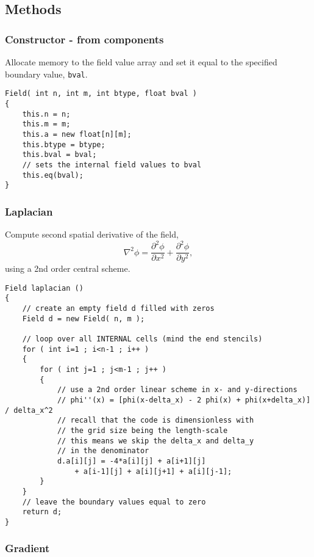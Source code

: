 \documentclass[notitlepage]{article}
\begin{document}
\subsection{Methods}

\subsubsection{Constructor - from components}

Allocate memory to the field value array and set it equal
to the specified boundary value, \texttt{bval}.

\begin{lstlisting}[style=myCpp]
Field( int n, int m, int btype, float bval )
{
	this.n = n;
	this.m = m;
	this.a = new float[n][m];
	this.btype = btype;
	this.bval = bval;
	// sets the internal field values to bval
	this.eq(bval);
}
\end{lstlisting}

\subsubsection{Laplacian}

Compute second spatial derivative of the field,
%
\begin{equation}
\nabla^2 \phi = \frac{\partial^2\phi}{\partial x^2}
	+ \frac{\partial^2\phi}{\partial y^2},
\end{equation}
%
using a 2nd order central scheme.

\begin{lstlisting}[style=myCpp]
Field laplacian ()
{
	// create an empty field d filled with zeros
	Field d = new Field( n, m );
	
	// loop over all INTERNAL cells (mind the end stencils)
	for ( int i=1 ; i<n-1 ; i++ )
	{
		for ( int j=1 ; j<m-1 ; j++ )
		{
			// use a 2nd order linear scheme in x- and y-directions
			// phi''(x) = [phi(x-delta_x) - 2 phi(x) + phi(x+delta_x)] / delta_x^2
			// recall that the code is dimensionless with
			// the grid size being the length-scale
			// this means we skip the delta_x and delta_y
			// in the denominator
			d.a[i][j] = -4*a[i][j] + a[i+1][j]
				+ a[i-1][j] + a[i][j+1] + a[i][j-1];
		}
	}
	// leave the boundary values equal to zero
	return d;
}
\end{lstlisting}

\subsubsection{Gradient}
\end{document}
